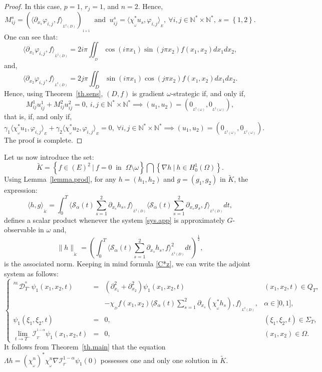 \documentclass{article}
\begin{document}
\begin{proof}
In this case, $p=1$, $r_j=1$, and $n=2$. Hence,
$$
M_{ij}^{s} = \left( \langle \partial_{x_s}\varphi_{i,j},
f\rangle_{_{L^2(D)}} \right)_{_{1\times 1}} \ 
\mbox{ and } \ u_{ij}^s = \langle \chi_{_\omega}^*u_s,
\varphi_{i,j} \rangle_{_{E}}, 
\ \forall i,j\in\mathbb{N}^*\times\mathbb{N}^*, 
\ s=\left\{1,2\right\}.
$$
One can see that:
$$
\langle \partial_{x_1} \varphi_{i,j},f\rangle_{_{L^2(D)}} 
= 2i\pi\displaystyle\iint_{_D}
\cos(i\pi x_1)\sin(j\pi x_2)f(x_1,x_2)dx_1 dx_2,
$$ 
and,
$$ 
\langle \partial_{x_2} \varphi_{i,j},f\rangle_{_{L^2(D)}} 
= 2j\pi\displaystyle\iint_{D}\sin(i\pi x_1)
\cos(j\pi x_2)f(x_1,x_2)dx_1dx_2.
$$
Hence, using Theorem~\ref{th.sens}, $(D,f)$ 
is gradient $\omega$-strategic if, and only if,
$$
M_{ij}^1u_{ij}^1 + M_{ij}^2u_{ij}^2 =0, 
\ i,j\in \mathbb{N}^*\times\mathbb{N}^* 
\implies (u_1,u_2)= (0_{_{L^2(\omega)}},0_{_{L^2(\omega)}}),
$$
that is, if, and only if,
$$
\gamma_1 \langle \chi_{_\omega}^*u_1,\varphi_{i,j}
\rangle_{_{E}} + \gamma_2 \langle 
\chi_{_\omega}^*u_2,\varphi_{i,j}\rangle_{_{E}} = 0, 
\ \forall i,j\in \mathbb{N}^*\times\mathbb{N}^* 
\implies (u_1,u_2) = (0_{_{L^2(\omega)}},0_{_{L^2(\omega)}}).
$$
The proof is complete.
\end{proof}

Let us now introduce the set:
$$
\tilde{K} = \left\{f \in (E)^2 \ | \ f= 0 
\ \mbox{ in } \ \Omega\setminus\omega\right\}
\bigcap\left\{\nabla h \ | \ h \in H^1_0(\Omega)\right\}.
$$
Using Lemma~\ref{lemma.prod}, for any $h = (h_1,h_2)$ 
and $g = (g_1,g_2)$ in $\tilde{K}$, the expression:
$$
\langle h,g \rangle_{_{\tilde{K}}} 
= \displaystyle\int_{0}^{T}\langle \mathcal{S}_\alpha(t)
\sum_{s=1}^{2}\partial_{x_s} h_s,f \rangle_{_{L^2(D)}}\langle 
\mathcal{S}_\alpha(t)\sum_{s=1}^{2}
\partial_{x_s}g_s,f \rangle_{_{L^2(D)}}dt,
$$
defines a scalar product whenever the system \eqref{sys.app} 
is approximately $G$-observable in $\omega$ and, 
$$
\|h\|_{_{\tilde{K}}} = \left(\displaystyle
\int_{0}^{T}\langle \mathcal{S}_\alpha(t)
\sum_{s=1}^{2}\partial_{x_s} h_s,
f \rangle_{_{L^2(D)}}^2dt\right)^{\frac{1}{2}},
$$
is the associated norm. Keeping in mind formula \eqref{C*z}, 
we can write the adjoint system as follows: 
\begin{equation*}
\left\{\begin{array}{rlll}
^{^{RL}}\mathcal{D}_{T^-}^{^\alpha}\psi_1(x_1,x_2,t) 
&=& \left(\partial_{x_1}^2 + \partial_{x_2}^2 \right)
\psi_1(x_1,x_2,t)  & (x_1,x_2,t)\in Q_T,\\ 
&  &  - \chi_{_{D}}f(x_1,x_2)\langle \mathcal{S}_\alpha(t)
\sum_{s=1}^{2}\partial_{x_s} 
(\chi_{_\omega}^* h_s),f \rangle_{_{L^2(D)}}, & \alpha\in]0,1],\\
\psi_1(\xi_1,\xi_2,t)& =& 0,  & (\xi_1,\xi_2,t)\in \Sigma_T, \\
\lim\limits_{t\rightarrow T^-}\mathcal{I}_{_{T^-}}^{^{1-\alpha}}
\psi_1(x_1,x_2,t) &=& 0, & (x_1,x_2)\in\Omega.
\end{array}\right.
\end{equation*} 
It follows from Theorem~\ref{th.main} that the equation 
$\Lambda h = (\chi_{_\omega}^{n})^*\chi_{_\omega}^{n}
\nabla\mathcal{I}_{_{T^-}}^{1-\alpha}\psi_1(0)$ 
possesses one and only one solution in $\tilde{K}$.
\end{document}
